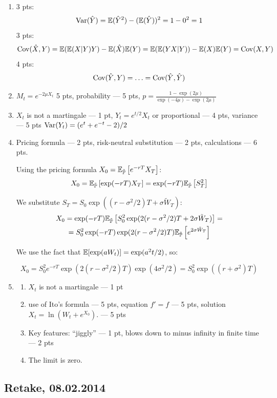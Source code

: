 \documentclass[pdftex,12pt,a4paper]{article}
\begin{document}
\begin{enumerate}
\item 3 pts:
\[
\operatorname{Var}(\hat{Y})=\mathbb{E}(\hat{Y}^2)-(\mathbb{E}(\hat{Y}))^2=1-0^2=1
\]
3 pts: 
\[
\operatorname{Cov}(\hat{X},Y)=\mathbb{E}(\mathbb{E}(X|Y)Y)-\mathbb{E}(\hat{X})\mathbb{E}(Y)=\mathbb{E}(\mathbb{E}(YX|Y))-\mathbb{E}(X)\mathbb{E}(Y)=\operatorname{Cov}(X,Y)
\]
4 pts:
\[
\operatorname{Cov}(\hat{Y},Y)=\ldots=\operatorname{Cov}(\hat{Y},\hat{Y})
\]

\item $M_t=e^{-2\mu X_t}$ 5 pts, probability --- 5 pts, $p=\frac{1-\exp(2\mu)}{\exp(-4\mu)-\exp(2\mu)}$

\item $X_t$ is not a martingale --- 1 pt, $Y_t=e^{t/2}X_t$ or proportional --- 4 pts, variance --- 5 pts $\operatorname{Var}(Y_t)=(e^t+e^{-t}-2)/2$

\item Pricing formula --- 2 pts, risk-neutral substitution --- 2 pts, calculations --- 6 pts.


Using the pricing formula $X_0=\mathbb{E}_{\tilde{\mathbb{P}}} \left[e^{-rT}X_T \right]$:
\[
X_0=\mathbb{E}_{\tilde{\mathbb{P}}} \left[\exp(-rT)X_T \right]=\exp(-rT)\mathbb{E}_{\tilde{\mathbb{P}}} \left[S^2_T \right]
\]

We substitute $S_T=S_0 \exp((r-\sigma^2/2)T+\sigma \tilde{W}_T)$: 
\begin{multline}
X_0=\exp(-rT)\mathbb{E}_{\tilde{\mathbb{P}}} \left[S^2_0 \exp(2(r-\sigma^2/2)T+2 \sigma \tilde{W}_T) \right]=\\
=S_0^2 \exp(-rT)\exp(2(r-\sigma^2/2)T)\mathbb{E}_{\tilde{\mathbb{P}}} \left[e^{2 \sigma \tilde{W}_T} \right]
\end{multline}

We use the fact that $\mathbb{E}[\exp(a W_t)]=\exp(a^2 t/ 2)$, so:

\[
X_0=  S_0^2 e^{-rT}\exp(2(r-\sigma^2/2)T) \exp(4\sigma^2/2) = S_0^2 \exp((r+\sigma^2)T)
\]

\item
\begin{enumerate}
\item  $X_t$ is not a martingale --- 1 pt
\item use of Ito's formula --- 5 pts, equation $f'=f$ --- 5 pts, solution $X_t=\ln(W_t+e^{X_0})$. --- 5 pts
\item Key features: ``jiggly'' ---  1 pt, blows down to minus infinity in finite time --- 2 pts 
\item The limit is zero.
\end{enumerate}

\end{enumerate}

\subsection{Retake, 08.02.2014}
\end{document}
